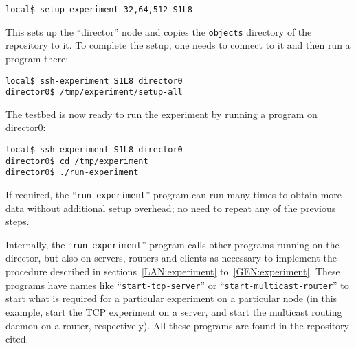 \documentclass[a4paper,11pt,twocolumn]{article}
\begin{document}
\begin{small}
\begin{verbatim}
local$ setup-experiment 32,64,512 S1L8
\end{verbatim}
\end{small}

This sets up the ``director'' node and copies the {\tt objects} directory
of the repository to it.  To complete the setup, one needs to connect to
it and then run a program there:

\begin{small}
\begin{verbatim}
local$ ssh-experiment S1L8 director0
director0$ /tmp/experiment/setup-all
\end{verbatim}
\end{small}

The testbed is now ready to run the experiment by running a program on
director0:

\begin{small}
\begin{verbatim}
local$ ssh-experiment S1L8 director0
director0$ cd /tmp/experiment
director0$ ./run-experiment
\end{verbatim}
\end{small}

If required, the ``{\tt run-experiment}'' program can run many times
to obtain more data without additional setup overhead; no need to
repeat any of the previous steps.

Internally, the ``{\tt run-experiment}'' program calls other programs
running on the director, but also on servers, routers and clients
as necessary to implement the procedure described in
sections~\ref{LAN:experiment} to~\ref{GEN:experiment}. These
programs have names like ``{\tt start-tcp-server}'' or
``{\tt start-multicast-router}'' to start what is required for
a particular experiment on a particular node (in this example,
start the TCP experiment on a server, and start the multicast
routing daemon on a router, respectively).  All these programs are
found in the repository cited.
\end{document}
